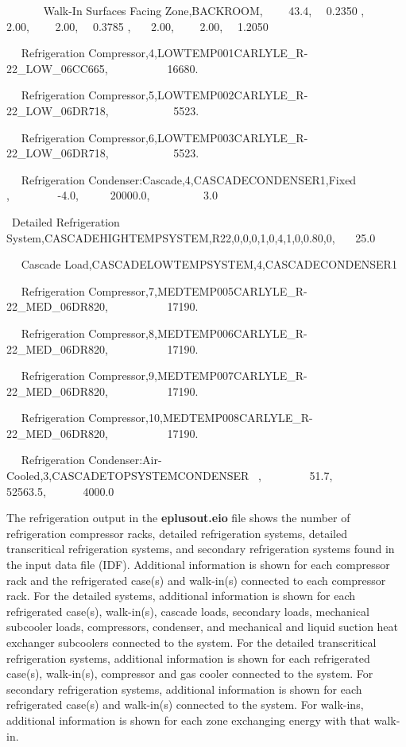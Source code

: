 ~~~~~~ Walk-In Surfaces Facing Zone,BACKROOM,~~~~ 43.4,~~ 0.2350 ,~~~ 2.00,~~~~ 2.00,~~ 0.3785 ,~~~ 2.00,~~~~ 2.00,~~ 1.2050

~~ Refrigeration Compressor,4,LOWTEMP001CARLYLE\_R-22\_LOW\_06CC665,~~~~~~~~~~ 16680.

~~ Refrigeration Compressor,5,LOWTEMP002CARLYLE\_R-22\_LOW\_06DR718,~~~~~~~~~~~ 5523.

~~ Refrigeration Compressor,6,LOWTEMP003CARLYLE\_R-22\_LOW\_06DR718,~~~~~~~~~~~ 5523.

~~ Refrigeration Condenser:Cascade,4,CASCADECONDENSER1,Fixed~ ,~~~~~~~~ -4.0,~~~~~ 20000.0,~~~~~~~~~ 3.0

~Detailed Refrigeration System,CASCADEHIGHTEMPSYSTEM,R22,0,0,0,1,0,4,1,0,0.80,0,~~~ 25.0

~~ Cascade Load,CASCADELOWTEMPSYSTEM,4,CASCADECONDENSER1

~~ Refrigeration Compressor,7,MEDTEMP005CARLYLE\_R-22\_MED\_06DR820,~~~~~~~~~~ 17190.

~~ Refrigeration Compressor,8,MEDTEMP006CARLYLE\_R-22\_MED\_06DR820,~~~~~~~~~~ 17190.

~~ Refrigeration Compressor,9,MEDTEMP007CARLYLE\_R-22\_MED\_06DR820,~~~~~~~~~~ 17190.

~~ Refrigeration Compressor,10,MEDTEMP008CARLYLE\_R-22\_MED\_06DR820,~~~~~~~~~~ 17190.

~~ Refrigeration Condenser:Air-Cooled,3,CASCADETOPSYSTEMCONDENSER~ ,~~~~~~~~ 51.7,~~~~~ 52563.5,~~~~~~ 4000.0

The refrigeration output in the \textbf{eplusout.eio} file shows the number of refrigeration compressor racks, detailed refrigeration systems, detailed transcritical refrigeration systems, and secondary refrigeration systems found in the input data file (IDF). Additional information is shown for each compressor rack and the refrigerated case(s) and walk-in(s) connected to each compressor rack. For the detailed systems, additional information is shown for each refrigerated case(s), walk-in(s), cascade loads, secondary loads, mechanical subcooler loads, compressors, condenser, and mechanical and liquid suction heat exchanger subcoolers connected to the system. For the detailed transcritical refrigeration systems, additional information is shown for each refrigerated case(s), walk-in(s), compressor and gas cooler connected to the system. For secondary refrigeration systems, additional information is shown for each refrigerated case(s) and walk-in(s) connected to the system. For walk-ins, additional information is shown for each zone exchanging energy with that walk-in.

